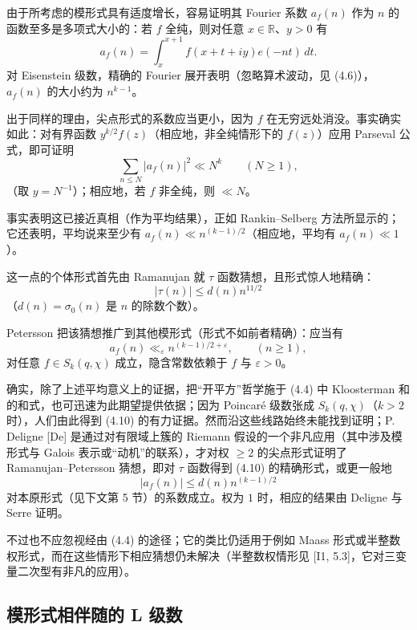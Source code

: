 由于所考虑的模形式具有适度增长，容易证明其 Fourier 系数 $a_{f}(n)$ 作为 $n$ 的函数至多是多项式大小的：若 $f$ 全纯，则对任意 $x\in\mathbb{R}$、$y>0$ 有
\[
a_{f}(n)=\int_{x}^{x+1}f(x+t+iy)e(-nt)\,dt.
\]
对 Eisenstein 级数，精确的 Fourier 展开表明（忽略算术波动，见 (4.6)），$a_{f}(n)$ 的大小约为 $n^{k-1}$。

出于同样的理由，尖点形式的系数应当更小，因为 $f$ 在无穷远处消没。事实确实如此：对有界函数 $y^{k/2}f(z)$（相应地，非全纯情形下的 $f(z)$）应用 Parseval 公式，即可证明
\begin{equation}\tag{4.8}\label{c3:eq:4.8}
\sum_{n\le N}|a_{f}(n)|^{2}\ll N^{k}\qquad(N\ge1),
\end{equation}
（取 $y=N^{-1}$）；相应地，若 $f$ 非全纯，则 $\ll N$。

事实表明这已接近真相（作为平均结果），正如 Rankin--Selberg 方法所显示的；它还表明，平均说来至少有 $a_{f}(n)\ll n^{(k-1)/2}$（相应地，平均有 $a_{f}(n)\ll1$）。

这一点的个体形式首先由 Ramanujan 就 $\tau$ 函数猜想，且形式惊人地精确：
\begin{equation}\tag{4.9}\label{c3:eq:4.9}
|\tau(n)|\le d(n)n^{11/2}
\end{equation}
（$d(n)=\sigma_{0}(n)$ 是 $n$ 的除数个数）。

Petersson 把该猜想推广到其他模形式（形式不如前者精确）：应当有
\begin{equation}\tag{4.10}\label{c3:eq:4.10}
a_{f}(n)\ll_{\varepsilon}n^{(k-1)/2+\varepsilon},\qquad(n\ge1),
\end{equation}
对任意 $f\in S_{k}(q,\chi)$ 成立，隐含常数依赖于 $f$ 与 $\varepsilon>0$。

确实，除了上述平均意义上的证据，把“开平方”哲学施于 (4.4) 中 Kloosterman 和的和式，也可迅速为此期望提供依据；因为 Poincaré 级数张成 $S_{k}(q,\chi)$（$k>2$ 时），人们由此得到 (4.10) 的有力证据。然而沿这些线路始终未能找到证明；P. Deligne [De] 是通过对有限域上簇的 Riemann 假设的一个非凡应用（其中涉及模形式与 Galois 表示或“动机”的联系），才对权 $\ge2$ 的尖点形式证明了 Ramanujan--Petersson 猜想，即对 $\tau$ 函数得到 (4.10) 的精确形式，或更一般地
\[
|a_{f}(n)|\le d(n)n^{(k-1)/2}
\]
对本原形式（见下文第 5 节）的系数成立。权为 $1$ 时，相应的结果由 Deligne 与 Serre 证明。

不过也不应忽视经由 (4.4) 的途径；它的类比仍适用于例如 Maass 形式或半整数权形式，而在这些情形下相应猜想仍未解决（半整数权情形见 [I1, 5.3]，它对三变量二次型有非凡的应用）。

\subsection{模形式相伴随的 L 级数}\label{c3:sec:4.3}

